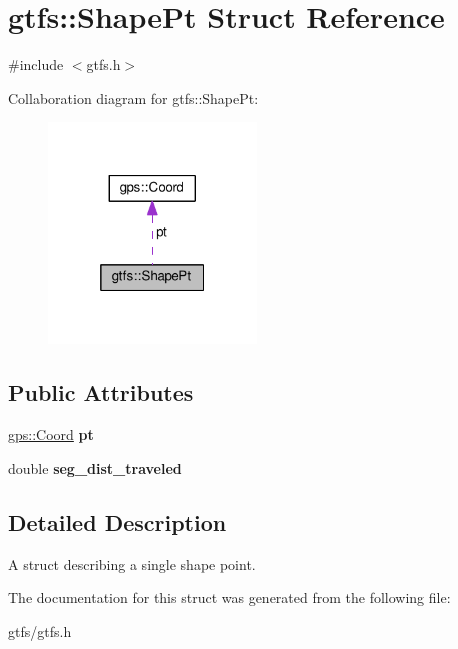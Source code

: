 \hypertarget{structgtfs_1_1ShapePt}{}\section{gtfs\+:\+:Shape\+Pt Struct Reference}
\label{structgtfs_1_1ShapePt}


{\ttfamily \#include $<$gtfs.\+h$>$}



Collaboration diagram for gtfs\+:\+:Shape\+Pt\+:
\nopagebreak
\begin{figure}[H]
\begin{center}
\leavevmode
\includegraphics[width=157pt]{structgtfs_1_1ShapePt__coll__graph}
\end{center}
\end{figure}
\subsection*{Public Attributes}
\begin{DoxyCompactItemize}
\item 
\mbox{\label{structgtfs_1_1ShapePt_ab79eb8263213afd27be9b257fca8515a}} 
\hyperlink{classgps_1_1Coord}{gps\+::\+Coord} {\bfseries pt}
\item 
\mbox{\label{structgtfs_1_1ShapePt_ad3fe477575279af15fe33e0ce36eaad2}} 
double {\bfseries seg\+\_\+dist\+\_\+traveled}
\end{DoxyCompactItemize}


\subsection{Detailed Description}
A struct describing a single shape point. 

The documentation for this struct was generated from the following file\+:\begin{DoxyCompactItemize}
\item 
gtfs/gtfs.\+h\end{DoxyCompactItemize}
